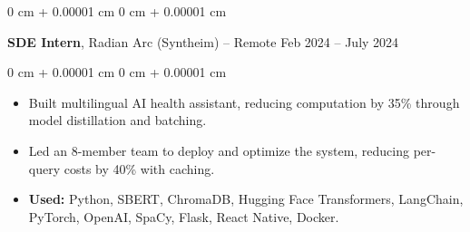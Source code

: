 \documentclass[10pt, letterpaper]{article}
\newenvironment{highlights}{
    \begin{itemize}[
        topsep=0.10 cm,
        parsep=0.10 cm,
        partopsep=0pt,
        itemsep=0pt,
        leftmargin=0 cm + 10pt
    ]
}{
    \end{itemize}
} %
\newenvironment{onecolentry}{
    \begin{adjustwidth}{
        0 cm + 0.00001 cm
    }{
        0 cm + 0.00001 cm
    }
}{
    \end{adjustwidth}
} %
\newenvironment{twocolentry}[2][]{
    \onecolentry
    \def\secondColumn{#2}
    \setcolumnwidth{\fill, 4 cm}
    \begin{paracol}{2}
}{
    \switchcolumn \raggedleft \secondColumn
    \end{paracol}
    \endonecolentry
} %
\begin{document}
        \vspace{0.2 cm}

        \begin{twocolentry}{
            Feb 2024 – July 2024
        }
            \textbf{SDE Intern}, Radian Arc (Syntheim) -- Remote\end{twocolentry}

        \vspace{0.10 cm}
        \begin{onecolentry}
            \begin{highlights}
                \item Built multilingual AI health assistant, reducing computation by 35\% through model distillation and batching.
                \item Led an 8-member team to deploy and optimize the system, reducing per-query costs by 40\% with caching.
                \item \textbf{Used:} Python, SBERT, ChromaDB, Hugging Face Transformers, LangChain, PyTorch, OpenAI, SpaCy, Flask, React Native, Docker.
            \end{highlights}
        \end{onecolentry}


    


            

                
\end{document}

